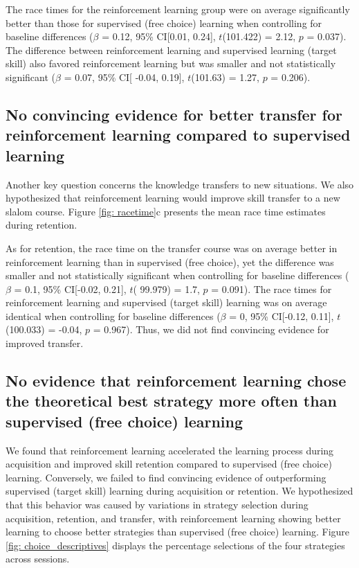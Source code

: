 \documentclass{article}
\begin{document}
The race times for the reinforcement learning group were on average significantly better than those for supervised (free choice) learning when controlling for baseline differences ($\beta$ = 0.12, 95\% CI[0.01, 0.24], $t$(101.422) = 2.12, $p$ = 0.037). The difference between reinforcement learning and supervised learning (target skill) also favored reinforcement learning but was smaller and not statistically significant ($\beta$ = 0.07, 95\% CI[ -0.04, 0.19], $t$(101.63) = 1.27, $p$ = 0.206). 

\subsection{No convincing evidence for better transfer for reinforcement learning compared to supervised learning} \label{result_racetime_transfer}
Another key question concerns the knowledge transfers to new situations. We also hypothesized that reinforcement learning would improve skill transfer to a new slalom course. Figure \ref{fig: racetime}c presents the mean race time estimates during retention.

As for retention, the race time on the transfer course was on average better in reinforcement learning than in supervised (free choice), yet the difference was smaller and not statistically significant when controlling for baseline differences ($\beta$ = 0.1, 95\% CI[-0.02, 0.21], $t$( 99.979) = 1.7, $p$  = 0.091). The race times for reinforcement learning and supervised (target skill) learning was on average identical when controlling for baseline differences ($\beta$ = 0, 95\% CI[-0.12, 0.11], $t$(100.033) = -0.04, $p$ = 0.967). Thus, we did not find convincing evidence for improved transfer.


\subsection{No evidence that reinforcement learning chose the theoretical best strategy more often than supervised (free choice) learning}\label{subsubsec3}
We found that reinforcement learning accelerated the learning process during acquisition and improved skill retention compared to supervised (free choice) learning. Conversely, we failed to find convincing evidence of outperforming supervised (target skill) learning during acquisition or retention. We hypothesized that this behavior was caused by variations in strategy selection during acquisition, retention, and transfer, with reinforcement learning showing better learning to choose better strategies than supervised (free choice) learning. Figure \ref{fig: choice_descriptives} displays the percentage selections of the four strategies across sessions.
\end{document}
